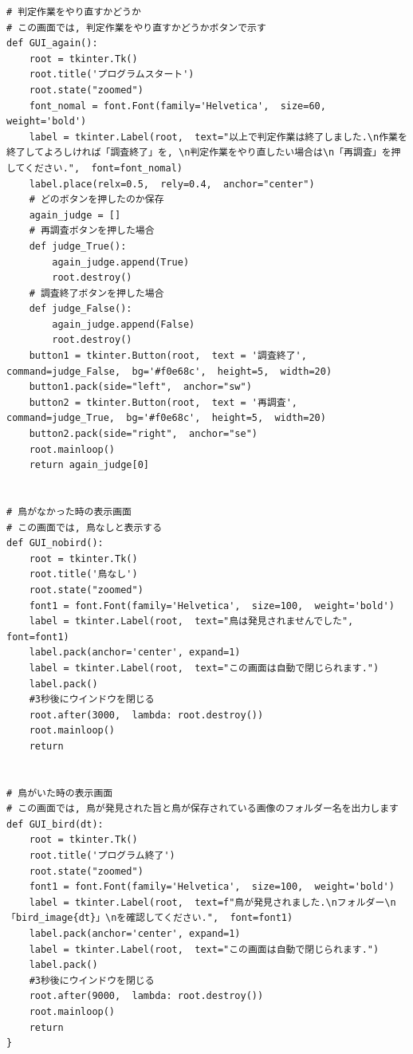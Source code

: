 \documentclass[dvipdfmx]{jsarticle}
\begin{document}
\begin{lstlisting}
# 判定作業をやり直すかどうか
# この画面では, 判定作業をやり直すかどうかボタンで示す
def GUI_again():
    root = tkinter.Tk()
    root.title('プログラムスタート')
    root.state("zoomed")
    font_nomal = font.Font(family='Helvetica',  size=60,  weight='bold')
    label = tkinter.Label(root,  text="以上で判定作業は終了しました.\n作業を終了してよろしければ「調査終了」を, \n判定作業をやり直したい場合は\n「再調査」を押してください.",  font=font_nomal)
    label.place(relx=0.5,  rely=0.4,  anchor="center")
    # どのボタンを押したのか保存
    again_judge = []
    # 再調査ボタンを押した場合
    def judge_True():
        again_judge.append(True)
        root.destroy()
    # 調査終了ボタンを押した場合
    def judge_False():
        again_judge.append(False)
        root.destroy()
    button1 = tkinter.Button(root,  text = '調査終了',  command=judge_False,  bg='#f0e68c',  height=5,  width=20)
    button1.pack(side="left",  anchor="sw")
    button2 = tkinter.Button(root,  text = '再調査',  command=judge_True,  bg='#f0e68c',  height=5,  width=20)
    button2.pack(side="right",  anchor="se")
    root.mainloop()
    return again_judge[0]


# 鳥がなかった時の表示画面
# この画面では, 鳥なしと表示する
def GUI_nobird():
    root = tkinter.Tk()
    root.title('鳥なし')
    root.state("zoomed")
    font1 = font.Font(family='Helvetica',  size=100,  weight='bold')
    label = tkinter.Label(root,  text="鳥は発見されませんでした",  font=font1)
    label.pack(anchor='center', expand=1)
    label = tkinter.Label(root,  text="この画面は自動で閉じられます.")
    label.pack()
    #3秒後にウインドウを閉じる
    root.after(3000,  lambda: root.destroy()) 
    root.mainloop()
    return


# 鳥がいた時の表示画面
# この画面では, 鳥が発見された旨と鳥が保存されている画像のフォルダー名を出力します
def GUI_bird(dt):
    root = tkinter.Tk()
    root.title('プログラム終了')
    root.state("zoomed")
    font1 = font.Font(family='Helvetica',  size=100,  weight='bold')
    label = tkinter.Label(root,  text=f"鳥が発見されました.\nフォルダー\n「bird_image{dt}」\nを確認してください.",  font=font1)
    label.pack(anchor='center', expand=1)
    label = tkinter.Label(root,  text="この画面は自動で閉じられます.")
    label.pack()
    #3秒後にウインドウを閉じる
    root.after(9000,  lambda: root.destroy()) 
    root.mainloop()
    return
}
\end{lstlisting}
\end{document}
